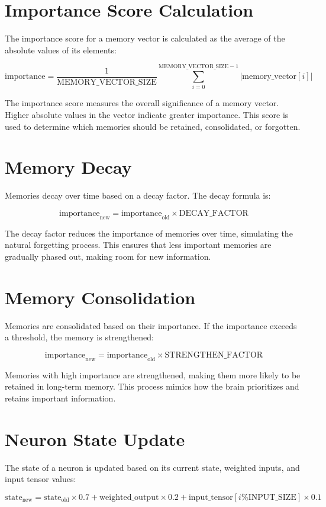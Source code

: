 \documentclass{article}
\begin{document}
\section{Importance Score Calculation}
The importance score for a memory vector is calculated as the average of the absolute values of its elements:

\[
\text{importance} = \frac{1}{\text{MEMORY\_VECTOR\_SIZE}} \sum_{i=0}^{\text{MEMORY\_VECTOR\_SIZE}-1} |\text{memory\_vector}[i]|
\]

The importance score measures the overall significance of a memory vector. Higher absolute values in the vector indicate greater importance. This score is used to determine which memories should be retained, consolidated, or forgotten.

\section{Memory Decay}
Memories decay over time based on a decay factor. The decay formula is:

\[
\text{importance}_{\text{new}} = \text{importance}_{\text{old}} \times \text{DECAY\_FACTOR}
\]

The decay factor reduces the importance of memories over time, simulating the natural forgetting process. This ensures that less important memories are gradually phased out, making room for new information.

\section{Memory Consolidation}
Memories are consolidated based on their importance. If the importance exceeds a threshold, the memory is strengthened:

\[
\text{importance}_{\text{new}} = \text{importance}_{\text{old}} \times \text{STRENGTHEN\_FACTOR}
\]

Memories with high importance are strengthened, making them more likely to be retained in long-term memory. This process mimics how the brain prioritizes and retains important information.

\section{Neuron State Update}
The state of a neuron is updated based on its current state, weighted inputs, and input tensor values:

\[
\text{state}_{\text{new}} = \text{state}_{\text{old}} \times 0.7 + \text{weighted\_output} \times 0.2 + \text{input\_tensor}[i \% \text{INPUT\_SIZE}] \times 0.1
\]
\end{document}
